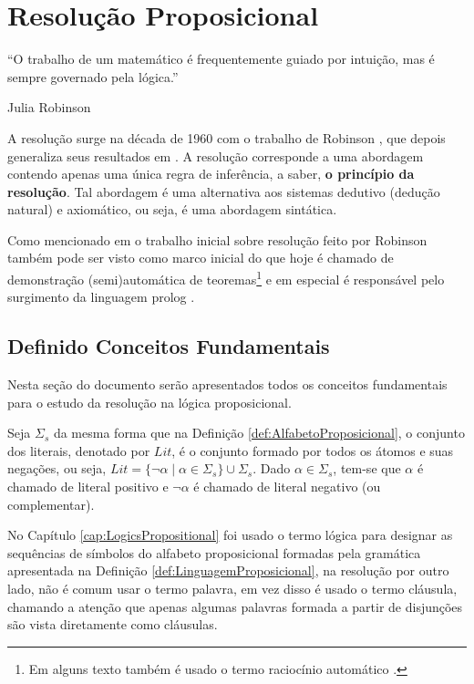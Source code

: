 \chapter{Resolução Proposicional}\label{cap:ResoltuionPropositional}

\epigraph{``O trabalho de um matemático é frequentemente guiado por intuição, mas é sempre governado pela lógica.''}{Julia Robinson}

A resolução surge na década de 1960 com o trabalho de Robinson \cite{robinson1965}, que depois generaliza seus resultados em \cite{robinson1983}. A resolução corresponde a uma abordagem contendo apenas uma única regra de inferência, a saber, \textbf{o princípio da resolução}. Tal abordagem é uma alternativa aos sistemas dedutivo (dedução natural) e axiomático, ou seja, é uma abordagem sintática.

Como mencionado em \cite{joaoPavao2014} o trabalho inicial sobre resolução feito por Robinson também pode ser visto como marco inicial do que hoje é chamado de demonstração (semi)automática de teoremas\footnote{Em alguns texto também é usado o termo raciocínio automático \cite{robinson2001, wos1988}.} e em especial é responsável pelo surgimento da linguagem prolog \cite{ayala2014}.

\section{Definido Conceitos Fundamentais}\label{sec:DefinitionsForResolution}

Nesta seção do documento serão apresentados todos os conceitos fundamentais para o estudo da resolução na lógica proposicional.

\begin{definicao}\label{def:Literais}
  Seja $\Sigma_s$ da mesma forma que na Definição \ref{def:AlfabetoProposicional}, o conjunto dos literais, denotado por $Lit$, é o conjunto formado por todos os átomos e suas negações, ou seja, $Lit = \{\neg \alpha \mid \alpha \in \Sigma_s\} \cup \Sigma_s$. Dado $\alpha \in \Sigma_s$, tem-se que $\alpha$ é chamado de literal positivo e $\neg \alpha$ é chamado de literal negativo (ou complementar).
\end{definicao}

No Capítulo \ref{cap:LogicsPropositional} foi usado o termo lógica para designar as sequências de símbolos do alfabeto proposicional formadas pela gramática apresentada na Definição \ref{def:LinguagemProposicional}, na resolução por outro lado, não é comum usar o termo palavra, em vez disso é usado o termo cláusula, chamando a atenção que apenas algumas palavras formada a partir de disjunções são vista diretamente como cláusulas.

